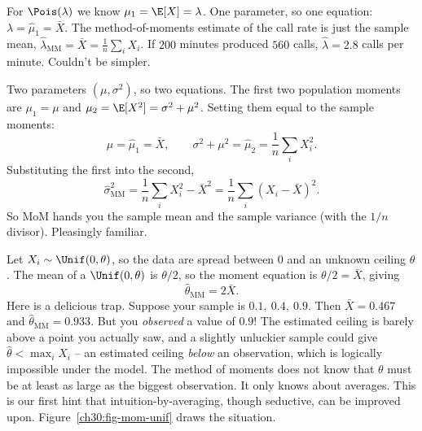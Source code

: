 \begin{example}
\label{ch30:ex-mom-pois}
For $\Pois(\lambda)$ we know $\mu_1 = \E[X] = \lambda$. One parameter, so one
equation: $\lambda = \hat\mu_1 = \bar X$. The method-of-moments estimate of the
call rate is just the sample mean,
$\hat\lambda_{\mathrm{MM}} = \bar X = \frac1n\sum_i X_i$. If $200$ minutes
produced $560$ calls, $\hat\lambda = 2.8$ calls per minute. Couldn't be simpler.
\end{example}

\begin{example}
\label{ch30:ex-mom-normal}
Two parameters $(\mu,\sigma^2)$, so two equations. The first two population
moments are $\mu_1 = \mu$ and $\mu_2 = \E[X^2] = \sigma^2 + \mu^2$. Setting them
equal to the sample moments:
\[
  \mu = \hat\mu_1 = \bar X,
  \qquad
  \sigma^2 + \mu^2 = \hat\mu_2 = \frac1n\sum_i X_i^2.
\]
Substituting the first into the second,
\[
  \hat\sigma^2_{\mathrm{MM}} = \frac1n\sum_i X_i^2 - \bar X^2
  = \frac1n\sum_i (X_i - \bar X)^2.
\]
So MoM hands you the sample mean and the sample variance (with the $1/n$
divisor). Pleasingly familiar.
\end{example}

\begin{example}
\label{ch30:ex-mom-unif}
Let $X_i \sim \Unif(0,\theta)$, so the data are spread between $0$ and an
unknown ceiling $\theta$. The mean of a $\Unif(0,\theta)$ is $\theta/2$, so the
moment equation is $\theta/2 = \bar X$, giving
\[
  \hat\theta_{\mathrm{MM}} = 2\bar X.
\]
Here is a delicious trap. Suppose your sample is
$0.1,\ 0.4,\ 0.9$. Then $\bar X = 0.467$ and
$\hat\theta_{\mathrm{MM}} = 0.933$. But you \emph{observed} a value of $0.9$!
The estimated ceiling is barely above a point you actually saw, and a slightly
unluckier sample could give $\hat\theta < \max_i X_i$ -- an estimated ceiling
\emph{below} an observation, which is logically impossible under the model. The
method of moments does not know that $\theta$ must be at least as large as the
biggest observation. It only knows about averages. This is our first hint that
intuition-by-averaging, though seductive, can be improved upon.
Figure~\ref{ch30:fig-mom-unif} draws the situation.
\end{example}

